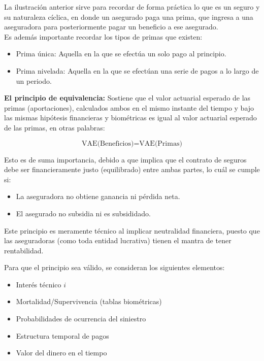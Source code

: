 \documentclass[12pt, a4paper, footinclude=true]{scrbook}
\begin{document}
La ilustración anterior sirve para recordar de forma práctica lo que es un seguro y su naturaleza cíclica, en donde un asegurado paga una prima, que ingresa a una aseguradora para posteriormente pagar un beneficio a ese asegurado.\\ 

Es además importante recordar los tipos de primas que existen: 

\begin{itemize}
	\item Prima única: Aquella en la que se efectúa un solo pago al principio. 
	\item Prima nivelada: Aquella en la que se efectúan una serie de pagos a lo largo de un periodo. 
\end{itemize}

\textbf{El principio de equivalencia:} Sostiene que el valor actuarial esperado de las primas (aportaciones), calculados ambos en el mismo instante del tiempo y bajo las mismas hipótesis financieras y biométricas es igual al valor actuarial esperado de las primas, en otras palabras: 

$$ \text{VAE(Beneficios)} = \text{VAE(Primas)}$$

Esto es de suma importancia, debido a que implica que el contrato de seguros debe ser financieramente justo (equilibrado) entre ambas partes, lo cuál se cumple si: 

\begin{itemize}
	\item La aseguradora no obtiene ganancia ni pérdida neta. 
	\item El asegurado no subsidia ni es subsididado.
\end{itemize}

Este principio es meramente técnico al implicar neutralidad financiera, puesto que las aseguradoras (como toda entidad lucrativa) tienen el mantra de tener rentabilidad. 

Para que el principio sea válido, se consideran los siguientes elementos: 

\begin{itemize}
	\item Interés técnico $i$ 
	\item Mortalidad/Supervivencia (tablas biométricas)
	\item Probabilidades de ocurrencia del siniestro
	\item Estructura temporal de pagos
	\item Valor del dinero en el tiempo
\end{itemize}
\end{document}
